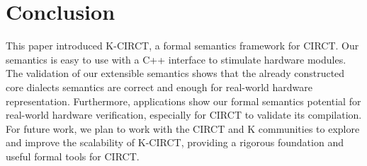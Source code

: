 \section{Conclusion}

This paper introduced K-CIRCT, a formal semantics framework for CIRCT. Our semantics is easy to use with a C++ interface to stimulate hardware modules. The validation of our extensible semantics shows that the already constructed core dialects semantics are correct and enough for real-world hardware representation. Furthermore, applications show our formal semantics potential for real-world hardware verification, especially for CIRCT to validate its compilation. For future work, we plan to work with the CIRCT and K communities to explore and improve the scalability of K-CIRCT, providing a rigorous foundation and useful formal tools for CIRCT.


